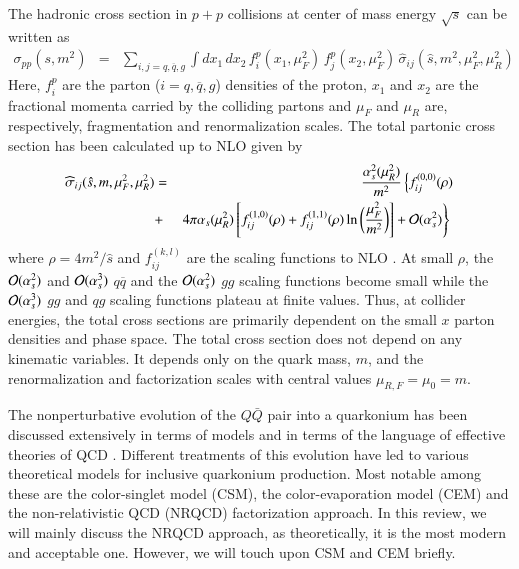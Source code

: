 The hadronic cross section in $p+p$ collisions at center of mass energy
$\sqrt{s}$ can be written as
\begin{eqnarray}
\sigma_{pp}(s,m^2) & = & \sum_{i,j = q, \overline q, g} 
\int dx_1 \, dx_2 \, 
f_i^p (x_1,\mu_F^2) \,
f_j^p(x_2,\mu_F^2) \, \widehat{\sigma}_{ij}(\hat{s},m^2,\mu_F^2,\mu_R^2)
\label{sigpp}
\end{eqnarray}
Here, $f_i^p$ are the parton (${i = q, \overline q, g}$) densities of the proton,
$x_1$ and $x_2$ are the fractional momenta carried by the colliding
partons and $\mu_F$ and $\mu_R$ are, respectively, fragmentation and renormalization scales. 
The total partonic cross section has been calculated up to NLO
\cite{Nason:1989zy,Nason:1987xz} given by
\begin{eqnarray}
\widehat{\sigma}_{ij}(\hat{s},m,\mu_F^2,\mu_R^2) & = & 
\frac{\alpha_s^2(\mu_R^2)}{m^2}
\left\{ f^{(0,0)}_{ij}(\rho) \right. \nonumber \\
 & + & \left. 4\pi \alpha_s(\mu_R^2) \left[f^{(1,0)}_{ij}(\rho) + 
f^{(1,1)}_{ij}(\rho)\ln\bigg(\frac{\mu_F^2}{m^2} \bigg) \right] 
+ {\cal O}(\alpha_s^2) \right\}
\,\, 
\label{sigpart}
\end{eqnarray}
where $\rho = 4m^2/\hat{s}$ and 
$f_{ij}^{(k,l)}$ are the scaling functions to NLO \cite{Nason:1989zy,Nason:1987xz}. 
At small $\rho$, the ${\cal O}(\alpha_s^2)$ and ${\cal O}(\alpha_s^3)$
$q \overline q$ and the ${\cal O}(\alpha_s^2)$ $gg$ scaling functions 
become small while the ${\cal O}(\alpha_s^3)$ $gg$ and $qg$ scaling functions
plateau at finite values.  Thus, at collider energies, the total cross sections
are primarily dependent on the small $x$ parton densities and phase space.
The total cross section does not depend on any kinematic variables. It depends  
only on the quark mass, $m$, and the renormalization and factorization scales with central
values $\mu_{R,F} =\mu_0 = m$.


The nonperturbative evolution of the $Q\bar Q$ pair into a quarkonium
has been discussed extensively in terms of models and in terms of the
language of effective theories of QCD
\cite{Bodwin:1994jh,Brambilla:2004wf}. Different
treatments of this evolution have led to various theoretical models for
inclusive quarkonium production. Most notable among these are the color-singlet
model (CSM), the color-evaporation model (CEM) and the non-relativistic QCD
(NRQCD) factorization approach. In this review, we will mainly discuss the NRQCD 
approach, as theoretically, it is the most modern and acceptable one. However,
we will touch upon CSM and CEM briefly. 





